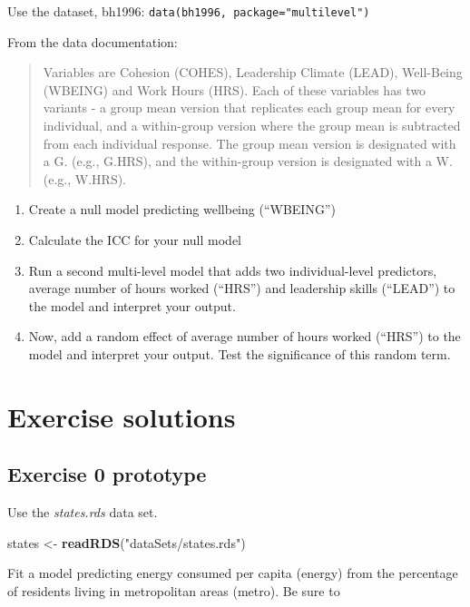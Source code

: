 \documentclass[]{book}
\newenvironment{Shaded}{\begin{snugshade}}{\end{snugshade}}
\newcommand{\KeywordTok}[1]{\textcolor[rgb]{0.13,0.29,0.53}{\textbf{#1}}}
\newcommand{\StringTok}[1]{\textcolor[rgb]{0.31,0.60,0.02}{#1}}
\newcommand{\NormalTok}[1]{#1}
\providecommand{\tightlist}{%
  \setlength{\itemsep}{0pt}\setlength{\parskip}{0pt}}
\begin{document}
Use the dataset, bh1996: \texttt{data(bh1996,\ package="multilevel")}

From the data documentation:

\begin{quote}
Variables are Cohesion (COHES), Leadership Climate (LEAD), Well-Being
(WBEING) and Work Hours (HRS). Each of these variables has two variants
- a group mean version that replicates each group mean for every
individual, and a within-group version where the group mean is
subtracted from each individual response. The group mean version is
designated with a G. (e.g., G.HRS), and the within-group version is
designated with a W. (e.g., W.HRS).
\end{quote}

\begin{enumerate}
\def\labelenumi{\arabic{enumi}.}
\tightlist
\item
  Create a null model predicting wellbeing (``WBEING'')
\item
  Calculate the ICC for your null model
\item
  Run a second multi-level model that adds two individual-level
  predictors, average number of hours worked (``HRS'') and leadership
  skills (``LEAD'') to the model and interpret your output.
\item
  Now, add a random effect of average number of hours worked (``HRS'')
  to the model and interpret your output. Test the significance of this
  random term.
\end{enumerate}

\section{Exercise solutions}\label{exercise-solutions}

\subsection{Exercise 0 prototype}\label{exercise-0-prototype}

Use the \emph{states.rds} data set.

\begin{Shaded}
\begin{Highlighting}[]
\NormalTok{  states <-}\StringTok{ }\KeywordTok{readRDS}\NormalTok{(}\StringTok{"dataSets/states.rds"}\NormalTok{)}
\end{Highlighting}
\end{Shaded}

Fit a model predicting energy consumed per capita (energy) from the
percentage of residents living in metropolitan areas (metro). Be sure to
\end{document}
